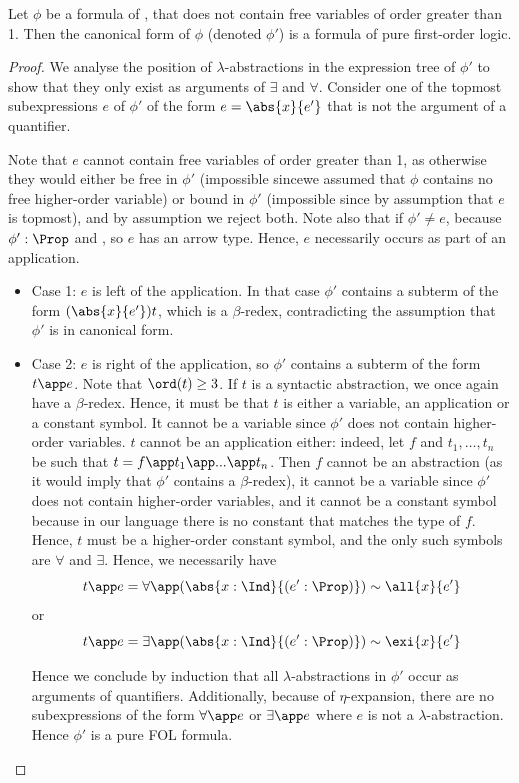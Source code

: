 \begin{theorem}
    \label{thm:canonical_lamfol}
    Let $\phi$ be a formula of \lamfol, that does not contain free variables of order greater than 1. Then the canonical form of $\phi$ (denoted $\phi'$) is a formula of pure first-order logic.
\end{theorem}
\begin{proof}
    We analyse the position of $\lambda$-abstractions in the expression tree of $\phi'$ to show that they only exist as arguments of $\exists$ and $\forall$. 
    Consider one of the topmost subexpressions $e$ of $\phi'$ of the form $e = \abs{x}{e'}$ that is not the argument of a quantifier.

    Note that $e$ cannot contain free variables of order greater than 1, as otherwise they would either be free in $\phi'$ (impossible sincewe assumed that $\phi$ contains no free higher-order variable) or bound in $\phi'$ (impossible since by assumption that $e$ is topmost), and by assumption we reject both. Note also that if $\phi' \neq e$, because $\phi': \Prop$ and , so $e$ has an arrow type.
    Hence, $e$ necessarily occurs as part of an application.
    \begin{itemize}
        \item Case 1: $e$ is left of the application. In that case $\phi'$ contains a subterm of the form $(\abs{x}{e'}) t$, which is a $\beta$-redex, contradicting the assumption that $\phi'$ is in canonical form.
        \item Case 2: $e$ is right of the application, so $\phi'$ contains a subterm of the form $t\app e$. Note that $\ord(t) \geq 3$. If $t$ is a syntactic abstraction, we once again have a $\beta$-redex. Hence, it must be that $t$ is either a variable, an application or a constant symbol. It cannot be a variable since $\phi'$ does not contain higher-order variables. $t$ cannot be an application either: indeed, let $f$ and $t_1, \ldots, t_n$ be such that $t = f\app t_1\app ...\app t_n$. Then $f$ cannot be an abstraction (as it would imply that $\phi'$ contains a $\beta$-redex), it cannot be a variable since $\phi'$ does not contain higher-order variables, and it cannot be a constant symbol because in our language there is no constant that matches the type of $f$. Hence, $t$ must be a higher-order constant symbol, and the only such symbols are $\forall$ and $\exists$. Hence, we necessarily have 
        $$
        t\app e = \forall \app (\abs{x: \Ind}{(e': \Prop)}) \sim \all{x}{e'}
        $$
        or
        $$
        t\app e = \exists \app (\abs{x: \Ind}{(e': \Prop)}) \sim \exi{x}{e'}
        $$
        
        Hence we conclude by induction that all $\lambda$-abstractions in $\phi'$ occur as arguments of quantifiers. Additionally, because of $\eta$-expansion, there are no subexpressions of the form $\forall \app e$ or $\exists\app e$ where $e$ is not a $\lambda$-abstraction.
        Hence $\phi'$ is a pure FOL formula.
    \end{itemize}
\end{proof}

